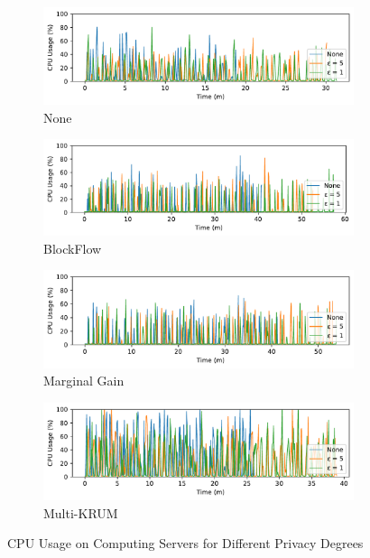 \begin{figure}[!ht]
    \centering
    \begin{subfigure}[b]{0.49\textwidth}
        \centering
        \includegraphics[width=\textwidth]{graphics/05_priv_cpu_none_server.pdf}
        \caption{None}
    \end{subfigure}
    \hfill
    \begin{subfigure}[b]{0.49\textwidth}
        \centering
        \includegraphics[width=\textwidth]{graphics/05_priv_cpu_blockflow_server.pdf}
        \caption{BlockFlow}
    \end{subfigure}
    \hfill
    \begin{subfigure}[b]{0.49\textwidth}
        \centering
        \includegraphics[width=\textwidth]{graphics/05_priv_cpu_marginalgain_server.pdf}
        \caption{Marginal Gain}
    \end{subfigure}
    \hfill
    \begin{subfigure}[b]{0.49\textwidth}
        \centering
        \includegraphics[width=\textwidth]{graphics/05_priv_cpu_multikrum_server.pdf}
        \caption{Multi-KRUM}
    \end{subfigure}
    \caption{CPU Usage on Computing Servers for Different Privacy Degrees}
    \label{fig:cpu_priv_degree_server}
\end{figure}

